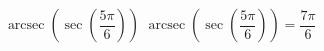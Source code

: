  {$\operatorname{arcsec}\left(\sec\left( \dfrac{5\pi}{6} \right) \right)$}
{ $\operatorname{arcsec}\left(\sec\left( \dfrac{5\pi}{6} \right) \right) = \dfrac{7\pi}{6}$}

